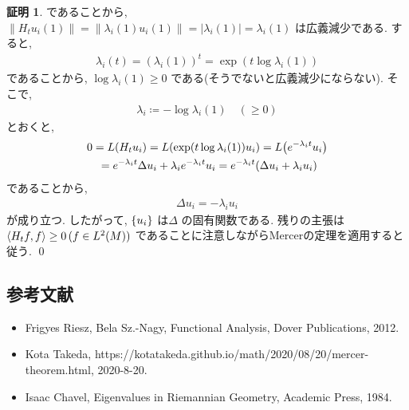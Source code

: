 \documentclass[10pt, fleqn, label-section=none]{bxjsarticle}
\theoremstyle{definition}
\newtheorem*{pf*}{証明}
\newcommand{\paren}[1]{\mleft( #1\mright )}
\newcommand{\cbra}[1]{\mleft\{#1\mright\}}
\newcommand{\tbra}[1]{\mleft\langle#1\mright\rangle}
\newcommand{\abs}[1]{\left|#1\right|}
\newcommand{\norm}[1]{\left\|#1\right\|}
\renewcommand{\-}{\hyphen}
\begin{document}
\begin{pf*}
であることから, $\norm{H_t u_i (1) } = \norm{\lambda_i (1) u_i(1)} = \abs{\lambda_i (1) } = \lambda_i (1) $ は広義減少である. すると,
\begin{align*} \lambda_i (t) = (\lambda_i (1) )^t = \exp(t \log \lambda_i (1) ) \end{align*}
であることから, $\log \lambda_i (1) \geq 0 $ である(そうでないと広義減少にならない). そこで, 
\begin{align*} \lambda_i \coloneqq - \log \lambda_i (1) \quad  (\geq 0 ) \end{align*}
とおくと, 
\begin{align*} &0 = L(H_t u_i) = L\paren{\exp (t \log \lambda_i (1)) u_i } =  L\paren{e^{-\lambda_i t} u_i } \\&\quad = e^{-\lambda_i t}\Delta u_i + \lambda_i e^{-\lambda_i t} u_i = e^{-\lambda_i t}(\Delta u_i + \lambda_i u_i)  \end{align*}
であることから,
\begin{align*} \Delta u_i = - \lambda_i u_i \end{align*}
が成り立つ. したがって, $\cbra{u_i}$ は$\Delta$ の固有関数である. 残りの主張は$\tbra{H_t f, f} \geq 0 \, (f \in L^2(M))$ であることに注意しながらMercerの定理を適用すると従う.
\qed
\end{pf*}


\subsection{参考文献}

\begin{itemize}
\item Frigyes Riesz, Bela Sz.-Nagy, Functional Analysis, Dover Publications, 2012.
\item Kota Takeda, https://kotatakeda.github.io/math/2020/08/20/mercer-theorem.html, 2020-8-20.
\item Isaac Chavel, Eigenvalues in Riemannian Geometry, Academic Press, 1984.
\end{itemize}
\end{document}

